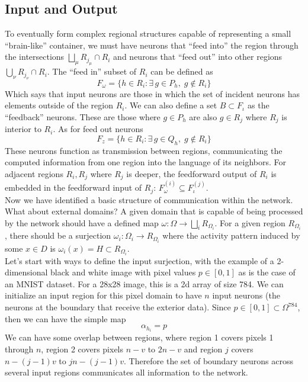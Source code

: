 \documentclass[11pt]{article}
\begin{document}
\subsection{Input and Output}
To eventually form complex regional structures capable of representing a small ``brain-like'' container, we must have neurons that ``feed into'' the region through the intersections $\bigsqcup_\mu R_{j_\mu} \cap R_i$ and neurons that ``feed out'' into other regions $\bigcup_\nu R_{j_\nu} \cap R_i$. The ``feed in'' subset of $R_i$ can be defined as
\begin{equation}
    F_\omega = \{h \in R_i : \exists\, g \in P_h,\; g \notin R_i \}
\end{equation}
Which says that input neurons are those in which the set of incident neurons has elements outside of the region $R_i$. We can also define a set $B \subset F_\iota$ as the ``feedback'' neurons. These are those where $g \in P_h$ are also $g \in R_j$ where $R_j$ is interior to $R_i$. As for feed out neurons
\begin{equation}
    F_z = \{h \in R_i : \exists\, g \in Q_h,\; g \notin R_i \}
\end{equation}
These neurons function as transmission between regions, communicating the computed information from one region into the language of its neighbors. For adjacent regions $R_i, R_j$ where $R_j$ is deeper, the feedforward output of $R_i$ is embedded in the feedforward input of $R_j$: $F_\omega^{(i)} \subseteq F_\iota^{(j)}$.\\ 

Now we have identified a basic structure of communication within the network. What about external domains? A given domain that is capable of being processed by the network should have a defined map $\omega: \Omega \to \bigsqcup_i R_{\Omega_i}$. For a given region $R_{\Omega_i}$, there should be a surjection $\omega_i: \Omega_i \to R_{\Omega_i}$ where the activity pattern induced by some $x \in D$ is $\omega_i(x) = H \subset R_{\Omega_i}$.\\

Let's start with ways to define the input surjection, with the example of a 2-dimensional black and white image with pixel values $p \in [0,1]$ as is the case of an MNIST dataset. For a 28x28 image, this is a 2d array of size 784. We can initialize an input region for this pixel domain to have $n$ input neurons (the neurons at the boundary that receive the exterior data). Since $p \in  [0,1] \subset \Omega^{784}$, then we can have the simple map
\begin{equation}
    \alpha_{h_i} = p 
\end{equation}
We can have some overlap between regions, where region 1 covers pixels 1 through $n$, region 2 covers pixels $n-v$ to $2n -v$ and region $j$ covers $n-(j-1)v$ to $jn - (j-1)v$. Therefore the set of boundary neurons across several input regions communicates all information to the network. \\
\end{document}
